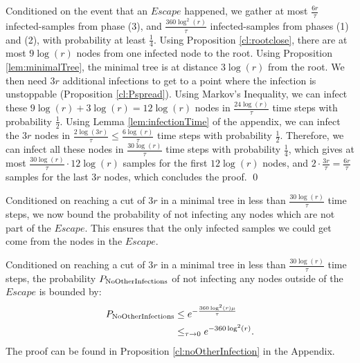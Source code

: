 \begin{lemma} \label{lem:escapeTime} 
Conditioned on the event that an $Escape$ happened, we gather at most  $\frac{6r}{\tau}$ infected-samples from phase (3), and $\frac{360\log^2(r)}{\tau}$ infected-samples from phases (1) and (2), with probability at least $\frac{1}{4}$.
\proof
Using Proposition \ref{cl:rootclose}, there are at most $9\log(r)$ nodes from one infected node to the root. Using Proposition \ref{lem:minimalTree}, the minimal tree is at distance $3\log(r)$ from the root. We then need $3r$ additional infections to get to a point where the infection is unstoppable (Proposition \ref{cl:Pspread}).  Using Markov's Inequality, we can infect these $9\log(r) + 3\log(r) = 12 \log(r)$ nodes in $\frac{24\log(r)}{\tau}$ time steps with probability $\frac{1}{2}$. Using Lemma \ref{lem:infectionTime} of the appendix, we can infect the $3r$ nodes in $\frac{2\log(3r)}{\tau} \leq \frac{6\log(r)}{\tau}$ time steps with probability $\frac{1}{2}$. Therefore, we can infect all these nodes in $\frac{30\log(r)}{\tau}$ time steps with probability $\frac{1}{4}$, which gives at most $\frac{30\log(r)}{\tau} \cdot 12 \log(r)$ samples for the first $12 \log(r)$ nodes, and $2 \cdot \frac{3r}{\tau} = \frac{6r}{\tau}$ samples for the last $3r$ nodes, which concludes the proof.
\qed
\end{lemma}

Conditioned on reaching a cut of $3r$ in a minimal tree in less than $\frac{30\log(r)}{\tau}$ time steps, we now bound the probability of not infecting any nodes which are not part of the $Escape$. This ensures that the only infected samples we could get come from the nodes in the $Escape$.

\begin{proposition}
	Conditioned on reaching a cut of $3r$ in a minimal tree in less than $\frac{30\log(r)}{\tau}$ time steps, the probability $P_{\rm NoOtherInfections}$ of not infecting any nodes outside of the $Escape$  is bounded by:
		\begin{align*}
		 P_{\rm NoOtherInfections} &\leq e^{-\frac{360\log^2(r)\mu}{\tau}} \\
		 &\leq_{\tau \to 0} e^{-360\log^2(r)}.
		 \end{align*}
	\proof The proof can be found in Proposition  \ref{cl:noOtherInfection} in the Appendix.
\end{proposition}


